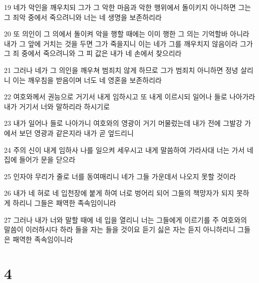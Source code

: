 \par 19 네가 악인을 깨우치되 그가 그 악한 마음과 악한 행위에서 돌이키지 아니하면 그는 그 죄악 중에서 죽으려니와 너는 네 생명을 보존하리라
\par 20 또 의인이 그 의에서 돌이켜 악을 행할 때에는 이미 행한 그 의는 기억할바 아니라 내가 그 앞에 거치는 것을 두면 그가 죽을지니 이는 네가 그를 깨우치지 않음이라 그가 그 죄 중에서 죽으려니와 그 피 값은 내가 네 손에서 찾으리라
\par 21 그러나 네가 그 의인을 깨우쳐 범죄치 않게 하므로 그가 범죄치 아니하면 정녕 살리니 이는 깨우침을 받음이며 너도 네 영혼을 보존하리라
\par 22 여호와께서 권능으로 거기서 내게 임하시고 또 내게 이르시되 일어나 들로 나아가라 내가 거기서 너와 말하리라 하시기로
\par 23 내가 일어나 들로 나아가니 여호와의 영광이 거기 머물렀는데 내가 전에 그발강 가에서 보던 영광과 같은지라 내가 곧 엎드리니
\par 24 주의 신이 내게 임하사 나를 일으켜 세우시고 내게 말씀하여 가라사대 너는 가서 네 집에 들어가 문을 닫으라
\par 25 인자야 무리가 줄로 너를 동여매리니 네가 그들 가운데서 나오지 못할 것이라
\par 26 내가 네 혀로 네 입천장에 붙게 하여 너로 벙어리 되어 그들의 책망자가 되지 못하게 하리니 그들은 패역한 족속임이니라
\par 27 그러나 내가 너와 말할 때에 네 입을 열리니 너는 그들에게 이르기를 주 여호와의 말씀이 이러하시다 하라 들을 자는 들을 것이요 듣기 싫은 자는 듣지 아니하리니 그들은 패역한 족속임이니라

\chapter{4}

